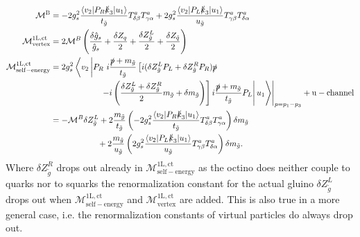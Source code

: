 \begin{align}
\mathcal{M}^{\mathrm{B}} &= -2g_s^2 \frac{\left\langle v_2 |P_R \slashed{k}_3|u_1\right\rangle}{t_{\tilde{g}}} T^a_{\delta \beta} T^a_{\gamma \alpha} + 2g_s^2 \frac{\left\langle v_2 |P_L \slashed{k}_3|u_1\right\rangle}{u_{\tilde{g}}} T^a_{\gamma\beta} T^a_{\delta\alpha}\\
\mathcal{M}^{\mathrm{1L,ct}}_{\mathrm{vertex}} &= 2 \mathcal{M}^B  \left( \frac{\delta \hat{g}_s}{\hat{g}_s} + \frac{\delta Z_q}{2} + \frac{\delta Z^L_{\tilde{g}}}{2} + \frac{\delta Z_{\tilde{q}}}{2} \right)\\
\mathcal{M}^{\mathrm{1L,ct}}_{\mathrm{self-energy}} &= 2g_s^2 \left\langle v_2 \left| P_R\ i\frac{\slashed{p}+m_{\tilde{g}}}{t_{\tilde{g}}} \left[  i(\delta Z_{\tilde{g}}^L P_L + \delta Z_{\tilde{g}}^R P_R)\slashed{p}  \right.\right.\right.\nonumber\\
& \hspace{2cm}\left.\left.\left.\left. -i\left( \frac{\delta Z_{\tilde{g}}^L + \delta Z_{\tilde{g}}^R}{2}m_{\tilde{g}} + \delta m_{\tilde{g}} \right) \right]i\frac{\slashed{p}+m_{\tilde{g}}}{t_{\tilde{g}}} P_L \right|u_1\right\rangle\right|_{p = p_1-p_3} + \mathrm{u-channel}\nonumber\\
&= -\mathcal{M}^B  \delta Z_{\tilde{g}}^L + 2  \frac{ m_{\tilde{g}}}{t_{\tilde{g}}} \left( -2g_s^2 \frac{\left\langle v_2 |P_R \slashed{k}_3|u_1\right\rangle}{t_{\tilde{g}}} T^a_{\delta \beta} T^a_{\gamma \alpha} \right)\delta m_{\tilde{g}}\nonumber\\ 
& \hspace{2cm}+ 2 \frac{ m_{\tilde{g}}}{u_{\tilde{g}}} \left( 2g_s^2 \frac{\left\langle v_2 |P_L \slashed{k}_3|u_1\right\rangle}{u_{\tilde{g}}} T^a_{\gamma\beta} T^a_{\delta\alpha} \right)\delta m_{\tilde{g}}.
\end{align}
Where $\delta Z^R_{\tilde{g}}$ drops out already in $\mathcal{M}^{\mathrm{1L,ct}}_{\mathrm{self-energy}}$ as the octino does neither couple to quarks nor to squarks the renormalization constant for the actual gluino $\delta Z^L_{\tilde{g}}$ drops out when $\mathcal{M}^{\mathrm{1L,ct}}_{\mathrm{self-energy}}$ and $\mathcal{M}^{\mathrm{1L,ct}}_{\mathrm{vertex}}$ are added. This is also true in a more general case, i.e. the renormalization constants of virtual particles do always drop out.
